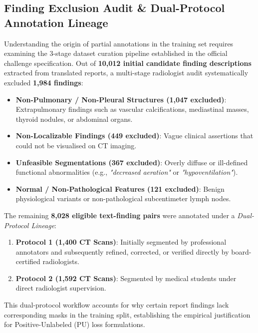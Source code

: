 \documentclass[11pt,a4paper]{article}
\begin{document}
\subsection{Finding Exclusion Audit \& Dual-Protocol Annotation Lineage}
Understanding the origin of partial annotations in the training set requires examining the 3-stage dataset curation pipeline established in the official challenge specification. Out of \textbf{10,012 initial candidate finding descriptions} extracted from translated reports, a multi-stage radiologist audit systematically excluded \textbf{1,984 findings}:
\begin{itemize}
    \item \textbf{Non-Pulmonary / Non-Pleural Structures (1,047 excluded)}: Extrapulmonary findings such as vascular calcifications, mediastinal masses, thyroid nodules, or abdominal organs.
    \item \textbf{Non-Localizable Findings (449 excluded)}: Vague clinical assertions that could not be visualised on CT imaging.
    \item \textbf{Unfeasible Segmentations (367 excluded)}: Overly diffuse or ill-defined functional abnormalities (e.g., \textit{"decreased aeration"} or \textit{"hypoventilation"}).
    \item \textbf{Normal / Non-Pathological Features (121 excluded)}: Benign physiological variants or non-pathological subcentimeter lymph nodes.
\end{itemize}
The remaining \textbf{8,028 eligible text-finding pairs} were annotated under a \textit{Dual-Protocol Lineage}:
\begin{enumerate}
    \item \textbf{Protocol 1 (1,400 CT Scans)}: Initially segmented by professional annotators and subsequently refined, corrected, or verified directly by board-certified radiologists.
    \item \textbf{Protocol 2 (1,592 CT Scans)}: Segmented by medical students under direct radiologist supervision.
\end{enumerate}
This dual-protocol workflow accounts for why certain report findings lack corresponding masks in the training split, establishing the empirical justification for Positive-Unlabeled (PU) loss formulations.
\end{document}
